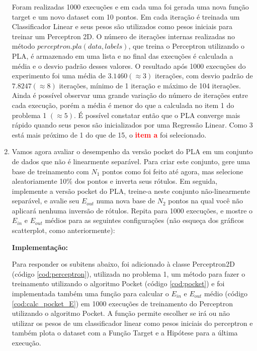 \begin{enumerate}
    Foram realizadas 1000 execuções e em cada uma foi gerada uma nova função target e um novo dataset com 10 pontos. Em cada iteração é treinada um Classificador Linear e seus pesos são utilizados como pesos iniciais para treinar um Perceptron 2D. O número de iterações internas realizadas no método $perceptron.pla(data,labels)$, que treina o Perceptron utilizando o PLA, é armazenado em uma lista e no final das execuções é calculada a média e o desvio padrão desses valores. O resultado após 1000 execuções do experimento foi uma média de $3.1460(\approx 3)$ iterações, com desvio padrão de $7.8247(\approx 8)$ iterações, mínimo de 1 iteração e máximo de 104 iterações. Ainda é possível observar uma grande variação do número de iterações entre cada execução, porém a média é menor do que a calculada no item 1 do problema 1 $(\approx 5)$. É possível constatar então que o PLA converge mais rápido quando seus pesos são inicializados por uma Regressão Linear. Como 3 está mais próximo de 1 do que de 15, o \textcolor{red}{\textbf{item a}} foi selecionado. 
    
    \item Vamos agora avaliar o desempenho da versão pocket do PLA em um conjunto de dados que não é linearmente separável. Para criar este conjunto, gere uma base de treinamento com $N_1$ pontos como foi feito até agora, mas selecione aleatoriamente 10\% dos pontos e inverta seus rótulos. Em seguida, implemente a versão pocket do PLA, treine-a neste conjunto não-linearmente separável, e avalie seu $E_{out}$ numa nova base de $N_2$ pontos na qual você não aplicará nenhuma inversão de rótulos. Repita para 1000 execuções, e mostre o $E_{in}$ e $E_{out}$ médios para as seguintes configurações (não esqueça dos gráficos scatterplot, como anteriormente):
    
    \par

    \textbf{Implementação:}
    
    Para responder os subitens abaixo, foi adicionado à classe Perceptron2D (código \ref{cod:perceptron}), utilizada no problema 1, um método para fazer o treinamento utilizando o algoritmo Pocket (código \ref{cod:pocket}) e foi implementada também uma função para calcular o $E_{in}$ e $E_{out}$ médio (código \ref{cod:calc_pocket_E}) em 1000 execuções de treinamento do Perceptron utilizando o algoritmo Pocket. A função permite escolher se irá ou não utilizar os pesos de um classificador linear como pesos iniciais do perceptron e também plota o dataset com a Função Target e a Hipótese para a última execução.


\end{enumerate}

